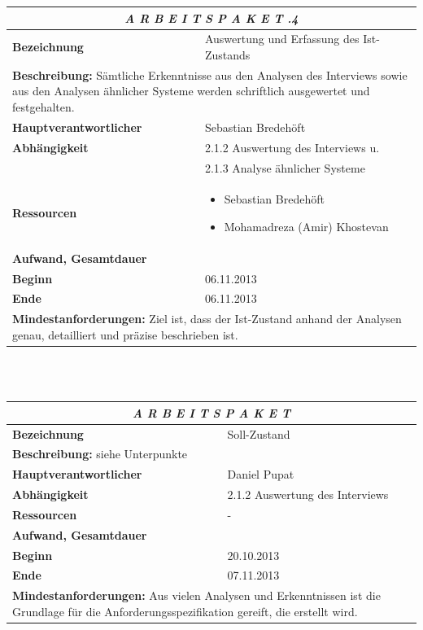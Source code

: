 \documentclass[fontsize=12pt,paper=a4,twoside]{scrartcl}
\begin{document}
\begin{tabular}{p{7.5cm}|p{7.5cm}}\toprule
\multicolumn{2}{c}{\textbf{\textit{A R B E I T S P A K E T \quad 2.1.4}}} \\ \toprule \hline
\textbf{Bezeichnung} & Auswertung und Erfassung des Ist-Zustands\\\hline
\multicolumn{2}{p{15cm}}{\textbf{Beschreibung:} \newline 
Sämtliche Erkenntnisse aus den Analysen des Interviews sowie aus den Analysen ähnlicher Systeme werden schriftlich ausgewertet und festgehalten.}  \\\hline
\textbf{Hauptverantwortlicher} & Sebastian Bredehöft \\\hline
\textbf{Abhängigkeit} & 2.1.2 Auswertung des Interviews u. \\ 
& 2.1.3 Analyse ähnlicher Systeme\\\hline
\textbf{Ressourcen} & \begin{itemize} 
\itemsep0pt
\item Sebastian Bredehöft
\item Mohamadreza (Amir) Khostevan
\end{itemize} \\\hline
\textbf{Aufwand, Gesamtdauer} & \\\hline
\textbf{Beginn} & 06.11.2013 \\\hline
\textbf{Ende} & 06.11.2013\\\hline
\multicolumn{2}{p{15cm}}{\textbf{Mindestanforderungen: } \newline
Ziel ist, dass der Ist-Zustand anhand der Analysen genau, detailliert und präzise beschrieben ist.}  \\ \toprule
\end{tabular} \\\\

\begin{tabular}{p{7.5cm}|p{7.5cm}}\toprule
\multicolumn{2}{c}{\textbf{\textit{A R B E I T S P A K E T \quad 2.2}}} \\ \toprule \hline
\textbf{Bezeichnung} & Soll-Zustand\\\hline
\multicolumn{2}{p{15cm}}{\textbf{Beschreibung:} \newline 
siehe Unterpunkte}  \\\hline
\textbf{Hauptverantwortlicher} & Daniel Pupat \\\hline
\textbf{Abhängigkeit} & 2.1.2 Auswertung des Interviews\\\hline
\textbf{Ressourcen} & -\\\hline
\textbf{Aufwand, Gesamtdauer} & \\\hline
\textbf{Beginn} & 20.10.2013 \\\hline
\textbf{Ende} & 07.11.2013\\\hline
\multicolumn{2}{p{15cm}}{\textbf{Mindestanforderungen: } \newline
Aus vielen Analysen und Erkenntnissen ist die Grundlage für die Anforderungsspezifikation gereift, die erstellt wird. }  \\ \toprule
\end{tabular} \\\\
\end{document}
